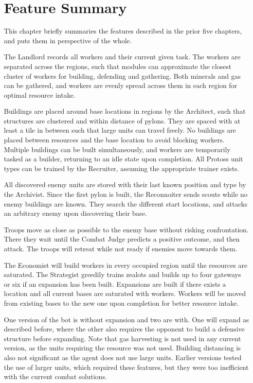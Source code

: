 \chapter{Feature Summary}
\label{ch:summary}
This chapter briefly summaries the features described in the prior five chapters, and puts them in perspective of the whole.

The Landlord records all workers and their current given task. The workers are separated across the regions, such that modules can approximate the closest cluster of workers for building, defending and gathering. Both minerals and gas can be gathered, and workers are evenly spread across them in each region for optimal resource intake.

Buildings are placed around base locations in regions by the Architect, such that structures are clustered and within distance of pylons. They are spaced with at least a tile in between such that large units can travel freely. No buildings are placed between resources and the base location to avoid blocking workers. Multiple buildings can be built simultaneously, and workers are temporarily tasked as a builder, returning to an idle state upon completion. All Protoss unit types can be trained by the Recruiter, assuming the appropriate trainer exists.

All discovered enemy units are stored with their last known position and type by the Archivist. Since the first pylon is built, the Reconnoiter sends scouts while no enemy buildings are known. They search the different start locations, and attacks an arbitrary enemy upon discovering their base.

Troops move as close as possible to the enemy base without risking confrontation. There they wait until the Combat Judge predicts a positive outcome, and then attack. The troops will retreat while not ready if enemies move towards them.

The Economist will build workers in every occupied region until the resources are saturated. The Strategist greedily trains zealots and builds up to four gateways or six if an expansion has been built. Expansions are built if there exists a location and all current bases are saturated with workers. Workers will be moved from existing bases to the new one upon completion for better resource intake.

One version of the bot is without expansion and two are with. One will expand as described before, where the other also requires the opponent to build a defensive structure before expanding. Note that gas harvesting is not used in any current version, as the units requiring the resource was not used. Building distancing is also not significant as the agent does not use large units. Earlier versions tested the use of larger units, which required these features, but they were too inefficient with the current combat solutions.